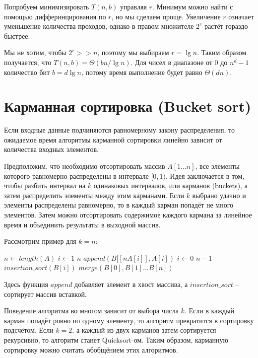 \documentclass[a4paper,11pt]{article}
\begin{document}
Попробуем минимизировать $T(n,b)$ управляя $r$. Минимум можно найти с помощью
дифферинцирования по $r$, но мы сделаем проще. Увеличение $r$ означает уменьшение
количества проходов, однако в правом множителе $2^r$ растёт гораздо быстрее.

Мы не хотим, чтобы $2^r >> n$, поэтому мы выбираем $r = \lg n$. Таким образом
получается, что $T(n, b) = \Theta(bn/\lg n)$. Для чисел в диапазоне от 0 до
$n^d - 1$ количество бит $b = d \lg n$, потому время выполнение будет равно
$\Theta(dn)$.

\section{Карманная сортировка (Bucket sort)}
Если входные данные подчиняются равномерному закону распределения, то ожидаемое
время алгоритмы карманной сортировки линейно зависит от количества входных
элементов.

Предположим, что необходимо отсортировать массив $A[1 \ldots n]$, все элементы
которого равномерно распределены в интервале $[0, 1)$. Идея заключается в том,
чтобы разбить интервал на $k$ одинаковых интервалов, или карманов (buckets), а
затем распределить элементы между этим карманами. Если $k$ выбрано удачно и
элементы распределены равномерно, то в каждый карман попадёт не много элементов.
Затем можно отсортировать содержимое каждого кармана за линейное время и
объединить результаты в выходной массив.

Рассмотрим пример для $k = n$:

\begin{codebox}
\li $n \gets length(A)$
\li \For $i \gets 1 $ \To $n$
\li      \Do $append(B[[nA[i]], A[i])$
  \End
\li \For $i \gets 0 $ \To $n-1$
\li      \Do $insertion\_sort(B[i])$
  \End
\li $merge(B[0], B[1] \ldots B[n])$
\end{codebox}

Здесь функция $append$ добавляет элемент в хвост массива, а $insertion\_sort$ --
сортирует массив вставкой.

Поведение алгоритма во многом зависит от выбора числа $k$. Если в каждый карман
попадёт ровно по одному элементу, то алгоритм превратится в сортировку
подсчётом. Если $k = 2$, а каждый из двух карманов затем сортируется рекурсивно,
то алгоритм станет Quicksort-ом. Таким образом, карманную сортировку можно
считать обобщёнием этих алгоритмов.
\end{document}
